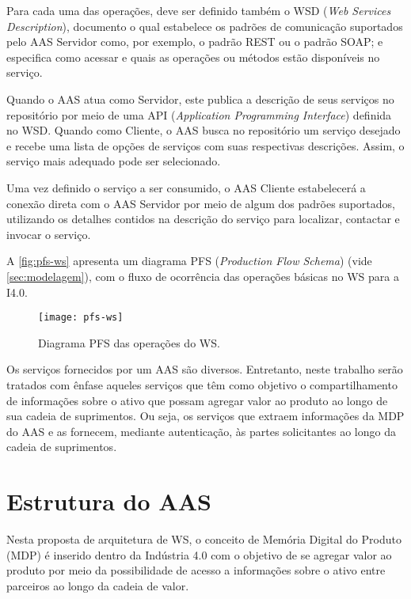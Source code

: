 	Para cada uma das operações, deve ser definido também o WSD (\textit{Web Services Description}), documento o qual estabelece os padrões de comunicação suportados pelo AAS Servidor como, por exemplo, o padrão REST ou o padrão SOAP; e especifica como acessar e quais as operações ou métodos estão disponíveis no serviço. 
	
	Quando o AAS atua como Servidor, este publica a descrição de seus serviços no repositório por meio de uma API (\textit{Application Programming Interface}) definida no WSD. Quando como Cliente, o AAS busca no repositório um serviço desejado e recebe uma lista de opções de serviços com suas respectivas descrições. Assim, o serviço mais adequado pode ser selecionado.
	
	Uma vez definido o serviço a ser consumido, o AAS Cliente estabelecerá a conexão direta com o AAS Servidor por meio de algum dos padrões suportados, utilizando os detalhes contidos na descrição do serviço para localizar, contactar e invocar o serviço.	
	
	A \autoref{fig:pfs-ws} apresenta um diagrama PFS (\textit{Production Flow Schema}) (vide \autoref{sec:modelagem}), com o fluxo de ocorrência das operações básicas no WS para a I4.0.
	
	\begin{figure}[htb]
		\centering
		\caption{Diagrama PFS das operações do WS.}
		\label{fig:pfs-ws}
		\texttt{[image: pfs-ws]}
	\end{figure}
	
	Os serviços fornecidos por um AAS são diversos. Entretanto, neste trabalho serão tratados com ênfase aqueles serviços que têm como objetivo o compartilhamento de informações sobre o ativo que possam agregar valor ao produto ao longo de sua cadeia de suprimentos. Ou seja, os serviços que extraem informações da MDP do AAS e as fornecem, mediante autenticação, às partes solicitantes ao longo da cadeia de suprimentos.

\section{Estrutura do AAS}

	Nesta proposta de arquitetura de WS, o conceito de Memória Digital do Produto (MDP) é inserido dentro da Indústria 4.0 com o objetivo de se agregar valor ao produto por meio da possibilidade de acesso a informações sobre o ativo entre parceiros ao longo da cadeia de valor.
	
